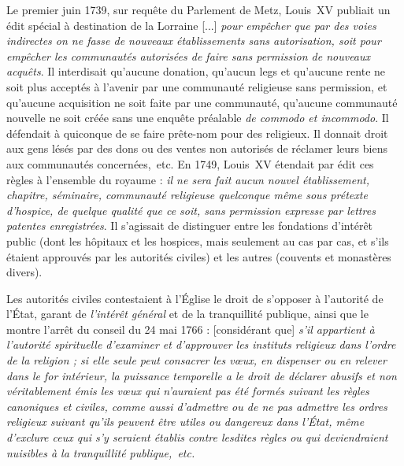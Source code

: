  Le premier juin 1739, sur requête du Parlement de Metz, Louis~XV publiait un édit spécial à destination de la Lorraine {[...] \emph{pour empêcher que par des voies indirectes on ne fasse de nouveaux établissements sans autorisation, soit pour empêcher les communautés autorisées de faire sans permission de nouveaux acquêts}}. Il interdisait qu'aucune donation, qu'aucun legs et qu'aucune rente ne soit plus acceptés à l'avenir par une communauté religieuse sans permission, et qu'aucune acquisition ne soit faite par une communauté, qu'aucune communauté nouvelle ne soit créée sans une enquête préalable \emph{de commodo et incommodo}. Il défendait à quiconque de se faire prête-nom pour des religieux. Il donnait droit aux gens lésés par des dons ou des ventes non autorisés de réclamer leurs biens aux communautés concernées,~etc. En 1749, Louis~XV étendait par édit ces règles à l'ensemble du royaume : \emph{il ne sera fait aucun nouvel établissement, chapitre, séminaire, communauté religieuse quelconque même sous prétexte d'hospice, de quelque qualité que ce soit, sans permission expresse par lettres patentes enregistrées}. Il s'agissait de distinguer entre les fondations d'intérêt public (dont les hôpitaux et les hospices, mais seulement au cas par cas, et s'ils étaient approuvés par les autorités civiles) et les autres (couvents et monastères divers). 

 Les autorités civiles contestaient à l'Église le droit de s'opposer à l'autorité de l'État, garant de \emph{l'intérêt général} et de la tranquillité publique, ainsi que le montre l'arrêt du conseil du 24 mai 1766 : [considérant que] \emph{s'il appartient à l'autorité spirituelle d'examiner et d'approuver les instituts religieux dans l'ordre de la religion ; si elle seule peut consacrer les vœux, en dispenser ou en relever dans le for intérieur, la puissance temporelle a le droit de déclarer abusifs et non véritablement émis les vœux qui n'auraient pas été formés suivant les règles canoniques et civiles, comme aussi d'admettre ou de ne pas admettre les ordres religieux suivant qu'ils peuvent être utiles ou dangereux dans l'État, même d'exclure ceux qui s'y seraient établis contre lesdites règles ou qui deviendraient nuisibles à la tranquillité publique,~etc.}
 
